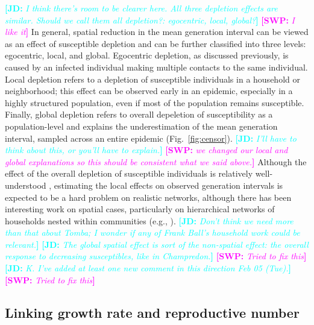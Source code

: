 \documentclass[12pt]{article}
\newcommand{\fref}[1]{Fig.~\ref{fig:#1}}
\newcommand{\comment}[3]{\textcolor{#1}{\textbf{[#2: }\textsl{#3}\textbf{]}}}
\newcommand{\jd}[1]{\comment{cyan}{JD}{#1}}
\newcommand{\swp}[1]{\comment{magenta}{SWP}{#1}}
\begin{document}
\jd{I think there's room to be clearer here. All three depletion effects are similar. Should we call them all depletion?: egocentric, local, global?} 
\swp{I like it}
In general, spatial reduction in the mean generation interval can be viewed as an effect of susceptible depletion and can be further classified into three levels: egocentric, local, and global.
Egocentric depletion, as discussed previously, is caused by an infected individual making multiple contacts to the same individual.
Local depletion refers to a depletion of susceptible individuals in a household or neighborhood;
this effect can be observed early in an epidemic, especially in a highly structured population, even if most of the population remains susceptible.
Finally, global depletion refers to overall depeletion of susceptibility as a population-level and explains the underestimation of the mean generation interval, sampled across an entire epidemic (\fref{censor}). 
\jd{I'll have to think about this, or you'll have to explain.} \swp{we changed our local and global explanations so this should be consistent what we said above.}
Although the effect of the overall depletion of susceptible individuals is relatively well-understood \citep{champredon2015intrinsic}, estimating the local effects on observed generation intervals is expected to be a hard problem on realistic networks, although there has been interesting work on spatial cases, particularly on hierarchical networks of households nested within communities (e.g.,  \cite{tomba2010some}). \jd{Don't think we need more than that about Tomba; I wonder if any of Frank Ball's household work could be relevant.}
\jd{The global spatial effect is sort of the non-spatial effect: the overall response to decreasing susceptibles, like in Champredon.}
\swp{Tried to fix this}
\jd{K. I've added at least one new comment in this direction Feb 05 (Tue).}
\swp{Tried to fix this}

\subsection{Linking growth rate and reproductive number}
\end{document}
